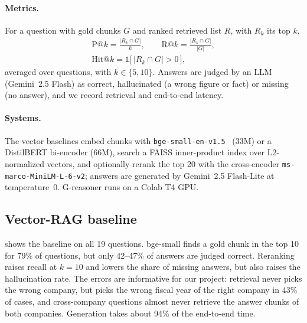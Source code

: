 \documentclass[10pt,twocolumn,letterpaper]{article}
\begin{document}
\paragraph{Metrics.}
For a question with gold chunks $G$ and ranked retrieved list $R$, with $R_k$ its top $k$,
\begin{equation}
  \begin{gathered}
  \mathrm{P@}k = \frac{|R_k \cap G|}{k},\qquad
  \mathrm{R@}k = \frac{|R_k \cap G|}{|G|},\\
  \mathrm{Hit@}k = \mathbb{1}\big[\,|R_k \cap G| > 0\,\big],
  \end{gathered}
  \label{eq:metrics}
\end{equation}
averaged over questions, with $k\in\{5,10\}$. Answers are judged by an LLM (Gemini~2.5 Flash) as
correct, hallucinated (a wrong figure or fact) or missing (no answer), and we record retrieval and
end-to-end latency.

\paragraph{Systems.}
The vector baselines embed chunks with \texttt{bge-small-en-v1.5}~\cite{xiao2023cpack} (33M) or a
DistilBERT bi-encoder (66M), search a FAISS inner-product index over L2-normalized vectors, and
optionally rerank the top 20 with the cross-encoder \texttt{ms-marco-MiniLM-L-6-v2}; answers are
generated by Gemini~2.5 Flash-Lite at temperature~0. G-reasoner runs on a Colab T4 GPU.

\subsection{Vector-RAG baseline}
\label{sec:exp-baseline}
 shows the baseline on all 19 questions. bge-small finds a gold chunk in the top
10 for 79\% of questions, but only 42--47\% of answers are judged correct. Reranking raises recall at
$k{=}10$ and lowers the share of missing answers, but also raises the hallucination rate. The errors
are informative for our project: retrieval never picks the wrong company, but picks the wrong fiscal
year of the right company in 43\% of cases, and cross-company questions almost never retrieve the
answer chunks of both companies. Generation takes about 94\% of the end-to-end time.
\end{document}

